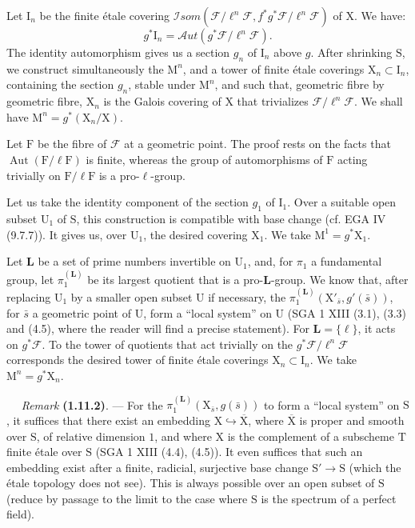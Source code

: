 \documentclass[11pt,leqno]{article}
\newcommand{\Page}[1]{\ifvmode\noindent\else\unskip\ \fi{\footnotesize\textcolor{gray}{[p.\,#1]}}\ \ignorespaces}
\begin{document}
Let \(\mathrm{I}_n\) be the finite étale covering \(\mathscr{I}\!som(\mathscr{F}/\ell^n\mathscr{F},f^*g^*\mathscr{F}/\ell^n\mathscr{F})\) of \(\mathrm{X}\). We have:
\[
g^*\mathrm{I}_n=\mathscr{A}\!ut(g^*\mathscr{F}/\ell^n\mathscr{F}).
\]
The identity automorphism gives us a section \(g_n\) of \(\mathrm{I}_n\) above \(g\). After shrinking \(\mathrm{S}\), we construct simultaneously the \(\mathrm{M}^n\), and a tower of finite étale coverings \(\mathrm{X}_n\subset\mathrm{I}_n\), containing the section \(g_n\), stable under \(\mathrm{M}^n\), and such that, geometric fibre by geometric fibre, \(\mathrm{X}_n\) is the Galois covering of \(\mathrm{X}\) that trivializes \(\mathscr{F}/\ell^n\mathscr{F}\). We shall have \(\mathrm{M}^n=g^*(\mathrm{X}_n/\mathrm{X})\).

Let \(\mathrm{F}\) be the fibre of \(\mathscr{F}\) at a geometric point. The proof rests on the facts that \(\operatorname{Aut}(\mathrm{F}/\ell\mathrm{F})\) is finite, whereas the group of automorphisms of \(\mathrm{F}\) acting trivially on \(\mathrm{F}/\ell\mathrm{F}\) is a pro-\(\ell\)-group.

Let us take the identity component of the section \(g_1\) of \(\mathrm{I}_1\). Over a suitable open subset \(\mathrm{U}_1\) of \(\mathrm{S}\), this construction is compatible with base change (cf. EGA IV (9.7.7)). It gives us, over \(\mathrm{U}_1\), the desired covering \(\mathrm{X}_1\). We take \(\mathrm{M}^1=g^*\mathrm{X}_1\).

Let \(\mathbf{L}\) be a set of prime numbers invertible on \(\mathrm{U}_1\), and, for \(\pi_1\) a fundamental group, let \(\pi_1^{(\mathbf{L})}\) be its largest quotient that is a pro-\(\mathbf{L}\)-group. We know that, after replacing \(\mathrm{U}_1\) by a smaller open subset \(\mathrm{U}\) if necessary, the \(\pi_1^{(\mathbf{L})}(\mathrm{X}'_{\bar{s}},g'(\bar{s}))\), for \(\bar{s}\) a geometric point of \(\mathrm{U}\), form a “local system” on \(\mathrm{U}\) (SGA 1 XIII (3.1), (3.3) and (4.5), where the reader will find a precise statement). For \(\mathbf{L}=\{\ell\}\), it acts on \(g^*\mathscr{F}\). To the tower of quotients that act trivially on the \(g^*\mathscr{F}/\ell^n\mathscr{F}\) corresponds the desired tower of finite étale coverings \(\mathrm{X}_n\subset\mathrm{I}_n\). We take \(\mathrm{M}^n=g^*\mathrm{X}_n\).

\Page{185}
\textit{Remark} \textbf{(1.11.2)}. — For the \(\pi_1^{(\mathbf{L})}(\mathrm{X}_{\bar{s}},g(\bar{s}))\) to form a “local system” on \(\mathrm{S}\), it suffices that there exist an embedding \(\mathrm{X}\hookrightarrow\overline{\mathrm{X}}\), where \(\overline{\mathrm{X}}\) is proper and smooth over \(\mathrm{S}\), of relative dimension \(1\), and where \(\mathrm{X}\) is the complement of a subscheme \(\mathrm{T}\) finite étale over \(\mathrm{S}\) (SGA 1 XIII (4.4), (4.5)). It even suffices that such an embedding exist after a finite, radicial, surjective base change \(\mathrm{S}'\to\mathrm{S}\) (which the étale topology does not see). This is always possible over an open subset of \(\mathrm{S}\) (reduce by passage to the limit to the case where \(\mathrm{S}\) is the spectrum of a perfect field).
\end{document}
